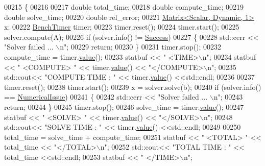 \begin{DoxyCode}
00215 \{
00216   
00217   \textcolor{keywordtype}{double} total\_time;
00218   \textcolor{keywordtype}{double} compute\_time;
00219   \textcolor{keywordtype}{double} solve\_time; 
00220   \textcolor{keywordtype}{double} rel\_error;
00221   \hyperlink{group___core___module}{Matrix<Scalar, Dynamic, 1>} x; 
00222   \hyperlink{class_eigen_1_1_bench_timer}{BenchTimer} timer; 
00223   timer.reset();
00224   timer.start();
00225   solver.compute(A); 
00226   \textcolor{keywordflow}{if} (solver.info() != \hyperlink{group__enums_gga85fad7b87587764e5cf6b513a9e0ee5ea52581b035f4b59c203b8ff999ef5fcea}{Success})
00227   \{
00228     std::cerr << \textcolor{stringliteral}{"Solver failed ... \(\backslash\)n"};
00229     \textcolor{keywordflow}{return};
00230   \}
00231   timer.stop();
00232   compute\_time = timer.\hyperlink{class_eigen_1_1_bench_timer_a26760f963ed8b64c126159bfea57735e}{value}();
00233   statbuf << \textcolor{stringliteral}{"    <TIME>\(\backslash\)n"}; 
00234   statbuf << \textcolor{stringliteral}{"     <COMPUTE> "} << timer.\hyperlink{class_eigen_1_1_bench_timer_a26760f963ed8b64c126159bfea57735e}{value}() << \textcolor{stringliteral}{"</COMPUTE>\(\backslash\)n"};
00235   std::cout<< \textcolor{stringliteral}{"COMPUTE TIME : "} << timer.\hyperlink{class_eigen_1_1_bench_timer_a26760f963ed8b64c126159bfea57735e}{value}() <<std::endl; 
00236     
00237   timer.reset();
00238   timer.start();
00239   x = solver.solve(b); 
00240   \textcolor{keywordflow}{if} (solver.info() == \hyperlink{group__enums_gga85fad7b87587764e5cf6b513a9e0ee5eaaf9b736d310a664e7729d163a035cc5f}{NumericalIssue})
00241   \{
00242     std::cerr << \textcolor{stringliteral}{"Solver failed ... \(\backslash\)n"};
00243     \textcolor{keywordflow}{return};
00244   \}
00245   timer.stop();
00246   solve\_time = timer.\hyperlink{class_eigen_1_1_bench_timer_a26760f963ed8b64c126159bfea57735e}{value}();
00247   statbuf << \textcolor{stringliteral}{"     <SOLVE> "} << timer.\hyperlink{class_eigen_1_1_bench_timer_a26760f963ed8b64c126159bfea57735e}{value}() << \textcolor{stringliteral}{"</SOLVE>\(\backslash\)n"}; 
00248   std::cout<< \textcolor{stringliteral}{"SOLVE TIME : "} << timer.\hyperlink{class_eigen_1_1_bench_timer_a26760f963ed8b64c126159bfea57735e}{value}() <<std::endl; 
00249   
00250   total\_time = solve\_time + compute\_time;
00251   statbuf << \textcolor{stringliteral}{"     <TOTAL> "} << total\_time << \textcolor{stringliteral}{"</TOTAL>\(\backslash\)n"}; 
00252   std::cout<< \textcolor{stringliteral}{"TOTAL TIME : "} << total\_time <<std::endl; 
00253   statbuf << \textcolor{stringliteral}{"    </TIME>\(\backslash\)n"}; 

\end{DoxyCode}
